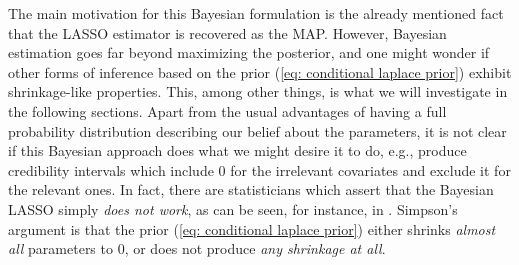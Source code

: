 \documentclass[a4paper, 10pt]{article}
\begin{document}
The main motivation for this Bayesian formulation is the already mentioned fact that the LASSO estimator is recovered as the MAP.
However, Bayesian estimation goes far beyond maximizing the posterior, and one might wonder if other forms of inference based on the prior (\ref{eq: conditional laplace prior}) exhibit shrinkage-like properties.
This, among other things, is what we will investigate in the following sections.
Apart from the usual advantages of having a full probability distribution describing our belief about the parameters, it is not clear if this Bayesian approach does what we might desire it to do, e.g., produce credibility intervals which include $ 0 $ for the irrelevant covariates and exclude it for the relevant ones.
In fact, there are statisticians which assert that the Bayesian LASSO simply \emph{does not work}, as can be seen, for instance, in \cite{simpson2021}.
Simpson's argument is that the prior (\ref{eq: conditional laplace prior}) either shrinks \emph{almost all} parameters to $ 0 $, or does not produce \emph{any shrinkage at all}.

\end{document}

